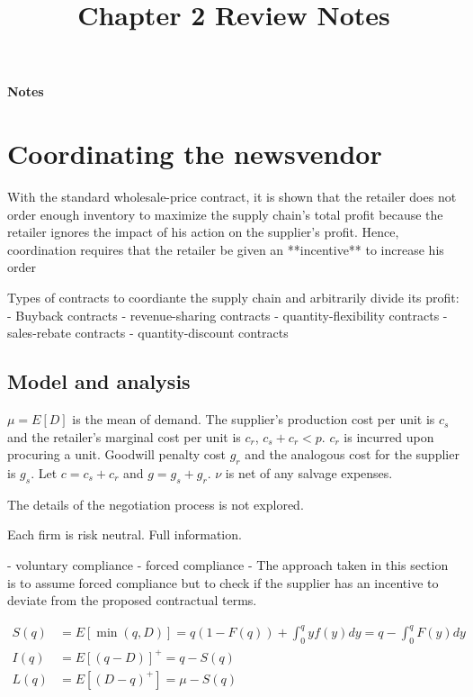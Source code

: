 \setcounter{section}{1}

\title{Chapter 2 Review Notes}

\thispagestyle{empty}

\begin{center}
{\LARGE \bf Notes}\\
\end{center}

\section{Coordinating the newsvendor}

With the standard wholesale-price contract, it is shown that the retailer does not order enough inventory to maximize the supply chain’s total profit because the retailer ignores the impact of his action on the supplier’s profit. Hence, coordination requires that the retailer be given an **incentive** to increase his order

Types of contracts to coordiante the supply chain and arbitrarily divide its profit:
- Buyback contracts
- revenue-sharing contracts
- quantity-flexibility contracts 
- sales-rebate contracts
- quantity-discount contracts


\subsection{Model and analysis}
$\mu=E[D]$ is the mean of demand. The supplier's production cost per unit is $c_s$ and the retailer's marginal cost per unit is $c_r$, $c_s+c_r<p$. $c_r$ is incurred upon procuring a unit. Goodwill penalty cost $g_r$ and the analogous cost for the supplier is $g_s$. Let $c=c_s+c_r$ and $g=g_s+g_r$. $\nu$ is net of any salvage expenses. 

The details of the negotiation process is not explored.

Each firm is risk neutral. Full information.

- voluntary compliance
- forced compliance
- The approach taken in this section is to assume forced compliance but to check if the supplier has an incentive to deviate from the proposed contractual terms.


\begin{align*}
    S(q)&=E[\min(q,D)]=q(1-F(q))+\int_0^q y f(y)dy=q-\int_0^q F(y)dy\\
    I(q)&=E[(q-D)]^+=q-S(q)\\
    L(q)&=E[(D-q)^+]=\mu-S(q)
\end{align*}

